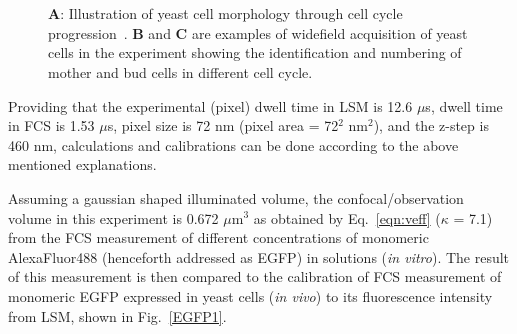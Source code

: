 \begin{figure}[!h]
\centering
\captionsetup[subfigure]{position=top}
\\\vspace{-0.7em}
\captionsetup[subfigure]{position=bottom}
\hspace{0.1mm}
\\
\caption{\textbf{A}: Illustration of yeast cell morphology through cell cycle progression~\cite{Yu2011}. 
\textbf{B} and \textbf{C} are examples of widefield acquisition of yeast cells in the experiment showing the identification and numbering of mother and bud cells in different cell cycle.}
\label{fig:wideyeast}
\end{figure}

Providing that the experimental (pixel) dwell time in LSM is 12.6 $\mu$s, dwell time in FCS is 1.53 $\mu$s, pixel size is 72 nm (pixel area = 72$^{2}$ nm$^{2}$), and the z-step is 460 nm, calculations and calibrations can be done according to the above mentioned explanations.

Assuming a gaussian shaped illuminated volume, the confocal/observation volume in this experiment is 0.672 $\mu$m$^{3}$ as obtained by Eq.~\ref{eqn:veff} ($\kappa$ = 7.1) from the FCS measurement of different concentrations of monomeric AlexaFluor488 (henceforth addressed as EGFP) in solutions (\textit{in vitro}). 
The result of this measurement is then compared to the calibration of FCS measurement of monomeric EGFP expressed in yeast cells (\textit{in vivo}) to its fluorescence intensity from LSM, shown in Fig.~\ref{EGFP1}.  


